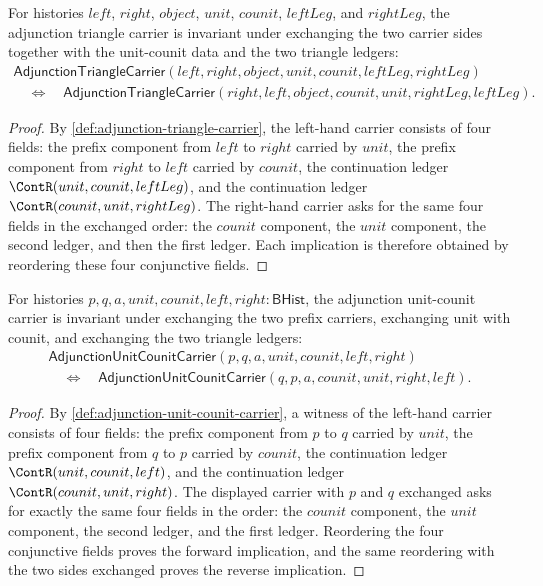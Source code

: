 \begin{theorem}
\label{thm:adjunction-triangle-carrier-carrier-swap-symmetry}
For histories $left$, $right$, $object$, $unit$, $counit$, $leftLeg$, and
$rightLeg$, the adjunction triangle carrier is invariant under exchanging the
two carrier sides together with the unit-counit data and the two triangle
ledgers:
$$
\begin{array}{l}
\mathsf{AdjunctionTriangleCarrier}(left,right,object,unit,counit,leftLeg,rightLeg)\\
\quad\Longleftrightarrow\quad
\mathsf{AdjunctionTriangleCarrier}(right,left,object,counit,unit,rightLeg,leftLeg).
\end{array}
$$
\end{theorem}
\begin{proof}
By \autoref{def:adjunction-triangle-carrier}, the left-hand carrier consists of
four fields: the prefix component from $left$ to $right$ carried by $unit$, the
prefix component from $right$ to $left$ carried by $counit$, the continuation
ledger $\ContR(unit,counit,leftLeg)$, and the continuation ledger
$\ContR(counit,unit,rightLeg)$. The right-hand carrier asks for the same four
fields in the exchanged order: the $counit$ component, the $unit$ component,
the second ledger, and then the first ledger. Each implication is therefore
obtained by reordering these four conjunctive fields.
\end{proof}

\begin{theorem}
\label{thm:adjunction-unit-counit-carrier-swap-symmetry}
For histories $p,q,a,unit,counit,left,right:\mathsf{BHist}$, the adjunction
unit-counit carrier is invariant under exchanging the two prefix carriers,
exchanging unit with counit, and exchanging the two triangle ledgers:
$$
\begin{array}{l}
\mathsf{AdjunctionUnitCounitCarrier}(p,q,a,unit,counit,left,right)\\
\quad\Longleftrightarrow\quad
\mathsf{AdjunctionUnitCounitCarrier}(q,p,a,counit,unit,right,left).
\end{array}
$$
\end{theorem}
\begin{proof}
By \autoref{def:adjunction-unit-counit-carrier}, a witness of the left-hand
carrier consists of four fields: the prefix component from $p$ to $q$ carried
by $unit$, the prefix component from $q$ to $p$ carried by $counit$, the
continuation ledger $\ContR(unit,counit,left)$, and the continuation ledger
$\ContR(counit,unit,right)$. The displayed carrier with $p$ and $q$ exchanged
asks for exactly the same four fields in the order: the $counit$ component,
the $unit$ component, the second ledger, and the first ledger. Reordering the
four conjunctive fields proves the forward implication, and the same
reordering with the two sides exchanged proves the reverse implication.
\end{proof}

